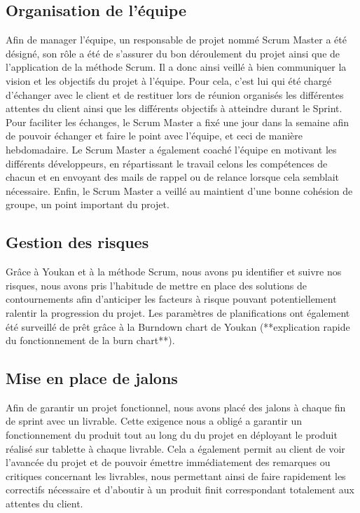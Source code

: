 \subsection{Organisation de l'équipe}

Afin de manager l'équipe, un responsable de projet nommé Scrum Master a été désigné, son rôle a été de s'assurer du bon déroulement du projet ainsi que de l'application de la méthode Scrum. Il a donc ainsi veillé à bien communiquer la vision et les objectifs du projet à l'équipe. Pour cela, c'est lui qui été chargé d'échanger avec le client et de restituer lors de réunion organisés les différentes attentes du client ainsi que les différents objectifs à atteindre durant le Sprint. Pour faciliter les échanges, le Scrum Master a fixé une jour dans la semaine afin de pouvoir échanger et faire le point avec l'équipe, et ceci de manière hebdomadaire. Le Scrum Master a également coaché l'équipe en motivant les différents développeurs, en répartissant le travail celons les compétences de chacun et en envoyant des mails de rappel ou de relance lorsque cela semblait nécessaire. Enfin, le Scrum Master a veillé au maintient d'une bonne cohésion de groupe, un point important du projet.

\subsection{Gestion des risques}

Grâce à Youkan et à la méthode Scrum, nous avons pu identifier et suivre nos risques, nous avons pris l'habitude de mettre en place des solutions de contournements afin d'anticiper les facteurs à risque pouvant potentiellement ralentir la progression du projet.
Les paramètres de planifications ont également été surveillé de prêt grâce à la Burndown chart de Youkan (**explication rapide du fonctionnement de la burn chart**).

\subsection{Mise en place de jalons}

Afin de garantir un projet fonctionnel, nous avons placé des jalons à chaque fin de sprint avec un livrable. Cette exigence nous a obligé a garantir un fonctionnement du produit tout au long du du projet en déployant le produit réalisé sur tablette à chaque livrable. Cela a également permit au client de voir l'avancée du projet et de pouvoir émettre immédiatement des remarques ou critiques concernant les livrables, nous permettant ainsi de faire rapidement les correctifs nécessaire et d'aboutir à un produit finit correspondant totalement aux attentes du client.  

